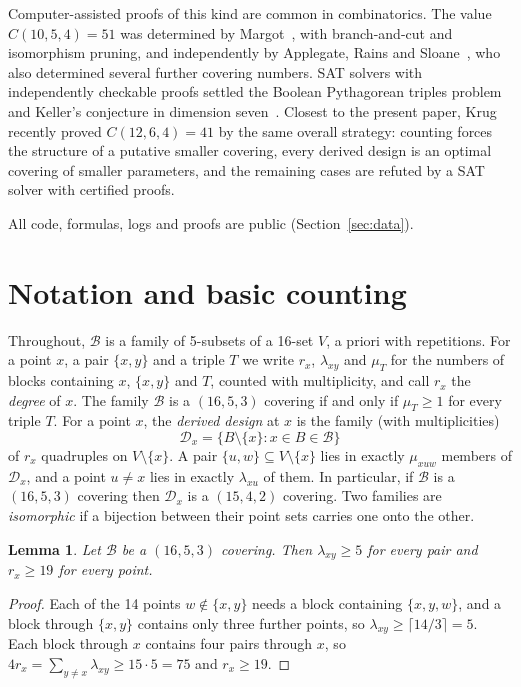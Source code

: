 \documentclass[11pt]{amsart}
\newtheorem{lemma}[theorem]{Lemma}
\theoremstyle{definition}
\theoremstyle{remark}
\newcommand{\cB}{\mathcal{B}}
\newcommand{\cD}{\mathcal{D}}
\begin{document}
Computer-assisted proofs of this kind are common in combinatorics.
The value $C(10,5,4)=51$ was determined by Margot~\cite{margot2003}, with
branch-and-cut and isomorphism pruning, and independently by Applegate, Rains
and Sloane~\cite{applegate2003}, who also determined several further
covering numbers. SAT solvers with independently
checkable proofs settled the Boolean Pythagorean triples
problem~\cite{heule2016} and Keller's conjecture in dimension
seven~\cite{brakensiek2022}. Closest to the present paper,
Krug~\cite{krug2026} recently proved $C(12,6,4)=41$ by the same overall
strategy: counting forces the structure of a putative smaller covering, every
derived design is an optimal covering of smaller parameters, and the remaining
cases are refuted by a SAT solver with certified proofs.

All code, formulas, logs and proofs are public (Section~\ref{sec:data}).

\section{Notation and basic counting}\label{sec:prelim}

Throughout, $\cB$ is a family of 5-subsets of a 16-set $V$, a priori with
repetitions. For a point $x$, a pair $\{x,y\}$ and a triple $T$ we write
$r_x$, $\lambda_{xy}$ and $\mu_T$ for the numbers of blocks containing $x$,
$\{x,y\}$ and $T$, counted with multiplicity, and call $r_x$ the
\emph{degree} of $x$. The family
$\cB$ is a $(16,5,3)$ covering if and only if $\mu_T\ge 1$ for every triple
$T$. For a point $x$, the \emph{derived design} at $x$ is the family
(with multiplicities)
\[
\cD_x=\{B\setminus\{x\}: x\in B\in\cB\}
\]
of $r_x$ quadruples on $V\setminus\{x\}$. A pair $\{u,w\}\subseteq
V\setminus\{x\}$ lies in exactly $\mu_{xuw}$ members of $\cD_x$, and a point
$u\ne x$ lies in exactly $\lambda_{xu}$ of them. In particular, if $\cB$ is a
$(16,5,3)$ covering then $\cD_x$ is a $(15,4,2)$ covering. Two families are
\emph{isomorphic} if a bijection between their point sets carries one onto the
other.

\begin{lemma}\label{lem:basic}
Let $\cB$ be a $(16,5,3)$ covering. Then $\lambda_{xy}\ge 5$ for every pair
and $r_x\ge 19$ for every point.
\end{lemma}

\begin{proof}
Each of the 14 points $w\notin\{x,y\}$ needs a block containing
$\{x,y,w\}$, and a block through $\{x,y\}$ contains only three further points,
so $\lambda_{xy}\ge\lceil 14/3\rceil=5$. Each block through $x$ contains four
pairs through $x$, so $4r_x=\sum_{y\ne x}\lambda_{xy}\ge 15\cdot 5=75$ and
$r_x\ge 19$.
\end{proof}
\end{document}

